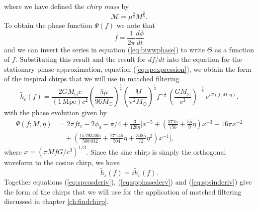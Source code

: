 where we have defined the \emph{chirp mass} by
\begin{equation}
\mathcal{M} = \mu^\frac{3}{5} M^\frac{2}{5}.
\end{equation}
To obtain the phase function $\Psi(f)$ we note that
\begin{equation}
f = \frac{1}{2\pi} \frac{d\phi}{dt}
\end{equation}
and we can invert the series in equation (\ref{eq:biwwphase}) to write
$\Theta$ as a function of $f$. Substituting this result and the result for
$df/dt$ into the equation for the stationary phase approximation, equation
(\ref{eq:spexpression}), we obtain the form of the inspiral chirps that we
will use in matched filtering
\begin{equation}
\label{eq:spcosderiv}
\tilde{h}_c(f)=\frac{2GM_\odot c}{(1\,\mathrm{Mpc})c^2}
\left(\frac{5\mu}{96M_\odot}\right)^\frac{1}{2}
\left(\frac{M}{\pi^2M_\odot}\right)^\frac{1}{3}
f^{-\frac{7}{6}}\, \left( \frac{GM_\odot}{c^3} \right)^{-\frac{1}{6}}\,
e^{i\Psi(f;M,\eta)}.
\end{equation}
with the phase evolution given by
\begin{equation}
\begin{split}
\Psi(f;M,\eta) &= 2\pi ft_c-2\phi_0-\pi/4+\frac{3}{128\eta}\biggl[x^{-5}+
\left(\frac{3715}{756}+\frac{55}{9}\eta\right)x^{-3}
-16\pi x^{-2} \\
&\quad +\left(\frac{15\,293\,365}{508\,032}+\frac{27\,145}{504}\eta
+\frac{3085}{72}\eta^2\right)x^{-1}\biggr],
\label{eq:spphasederv}
\end{split}
\end{equation}
where $x=(\pi M f G/c^3)^{1/3}$. Since the sine chirp is simply the orthogonal
waveform to the cosine chirp, we have
\begin{equation}
\tilde{h}_s(f)=i\tilde{h}_c(f).
\label{eq:spsinderiv}
\end{equation}
Together equations (\ref{eq:spcosderiv}), (\ref{eq:spphasederv}) and
(\ref{eq:spsinderiv}) give the form of the chirps that we will use for the
application of matched filtering discussed in chapter \ref{ch:findchirp}.

\newpage

